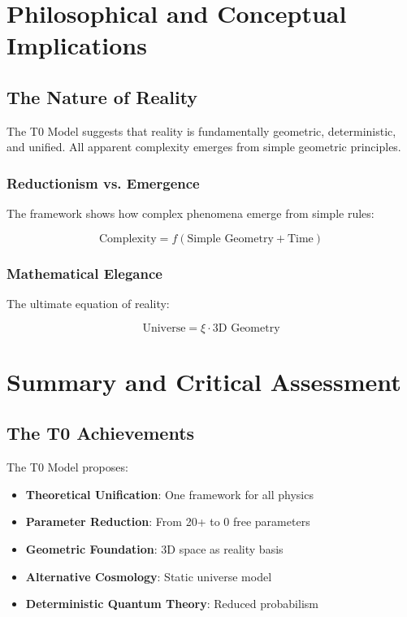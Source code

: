 	\chapter{Philosophical and Conceptual Implications}
	
	\section{The Nature of Reality}
	
	\begin{insight}
		The T0 Model suggests that reality is fundamentally geometric, deterministic, and unified. All apparent complexity emerges from simple geometric principles.
	\end{insight}
	
	\subsection{Reductionism vs. Emergence}
	
	The framework shows how complex phenomena emerge from simple rules:
	
	\begin{equation}
		\text{Complexity} = f(\text{Simple Geometry} + \text{Time})
	\end{equation}
	
	\subsection{Mathematical Elegance}
	
	The ultimate equation of reality:
	
	\begin{equation}
		\boxed{\text{Universe} = \xi \cdot \text{3D Geometry}}
	\end{equation}
	
	\chapter{Summary and Critical Assessment}
	
	\section{The T0 Achievements}
	
	The T0 Model proposes:
	
	\begin{itemize}
		\item \textbf{Theoretical Unification}: One framework for all physics
		\item \textbf{Parameter Reduction}: From 20+ to 0 free parameters
		\item \textbf{Geometric Foundation}: 3D space as reality basis
		\item \textbf{Alternative Cosmology}: Static universe model
		\item \textbf{Deterministic Quantum Theory}: Reduced probabilism
	\end{itemize}
	
